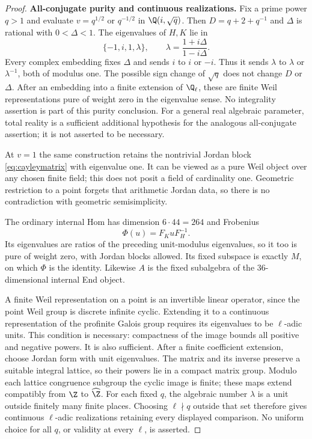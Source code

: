 \begin{proof}
\par\smallskip\noindent\textbf{All-conjugate purity and continuous realizations.}\quad
Fix a prime power $q>1$ and evaluate $v=q^{1/2}$ or $q^{-1/2}$
in $\Q(i,\sqrt q)$. Then $D=q+2+q^{-1}$ and $\Delta$ is
rational with $0<\Delta<1$. The eigenvalues of $H,K$ lie in
\[
 \{-1,i,1,\lambda\},\qquad
 \lambda=\frac{1+i\Delta}{1-i\Delta}.
\]
Every complex embedding fixes $\Delta$ and sends $i$ to
$i$ or $-i$. Thus it sends $\lambda$ to $\lambda$ or
$\lambda^{-1}$, both of modulus one. The possible sign
change of $\sqrt q$ does not change $D$ or $\Delta$.
After an embedding into a finite extension of $\Q_\ell$,
these are finite Weil representations pure of weight zero
in the eigenvalue sense. No integrality assertion is
part of this purity conclusion.
For a general real algebraic parameter, total reality is a
sufficient additional hypothesis for the analogous all-conjugate
assertion; it is not asserted to be necessary.

At $v=1$ the same construction retains the nontrivial Jordan
block \eqref{eq:cayleymatrix} with eigenvalue one. It can be
viewed as a pure Weil object over any chosen finite field;
this does not posit a field of cardinality one.
Geometric restriction to a point forgets that arithmetic
Jordan data, so there is no contradiction with geometric
semisimplicity.

The ordinary internal Hom has dimension $6\cdot44=264$ and
Frobenius
\[
 \Phi(u)=F_KuF_H^{-1}.
\]
Its eigenvalues are ratios of the preceding unit-modulus
eigenvalues, so it too is pure of weight zero, with Jordan
blocks allowed. Its fixed subspace is exactly $M$, on which
$\Phi$ is the identity. Likewise $A$ is the fixed subalgebra
of the $36$-dimensional internal End object.

A finite Weil representation on a point is an invertible
linear operator, since the point Weil group is discrete
infinite cyclic. Extending it to a continuous representation
of the profinite Galois group requires its eigenvalues to be
$\ell$-adic units. This condition is necessary: compactness
of the image bounds all positive and negative powers.
It is also sufficient. After a finite coefficient extension,
choose Jordan form with unit eigenvalues. The matrix and
its inverse preserve a suitable integral lattice, so their
powers lie in a compact matrix group. Modulo each lattice
congruence subgroup the cyclic image is finite; these maps
extend compatibly from $\Z$ to $\widehat{\Z}$.
For each fixed $q$, the algebraic number $\lambda$ is a unit
outside finitely many finite places. Choosing
$\ell\nmid q$ outside that set therefore gives continuous
$\ell$-adic realizations retaining every displayed comparison.
No uniform choice for all $q$, or validity at every $\ell$,
is asserted.


\end{proof}
